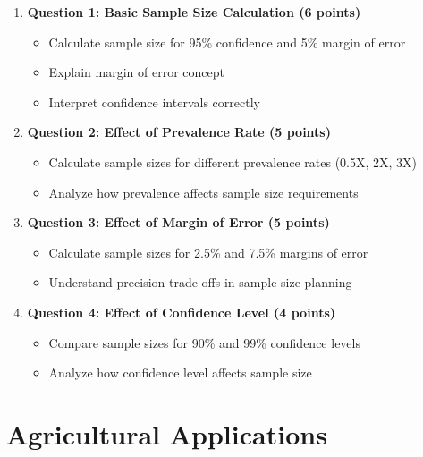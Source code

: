 \documentclass[11pt,a4paper]{article}
\begin{document}
\begin{enumerate}
    \item \textbf{Question 1: Basic Sample Size Calculation (6 points)}
    \begin{itemize}
        \item Calculate sample size for 95\% confidence and 5\% margin of error
        \item Explain margin of error concept
        \item Interpret confidence intervals correctly
    \end{itemize}
    
    \item \textbf{Question 2: Effect of Prevalence Rate (5 points)}
    \begin{itemize}
        \item Calculate sample sizes for different prevalence rates (0.5X, 2X, 3X)
        \item Analyze how prevalence affects sample size requirements
    \end{itemize}
    
    \item \textbf{Question 3: Effect of Margin of Error (5 points)}
    \begin{itemize}
        \item Calculate sample sizes for 2.5\% and 7.5\% margins of error
        \item Understand precision trade-offs in sample size planning
    \end{itemize}
    
    \item \textbf{Question 4: Effect of Confidence Level (4 points)}
    \begin{itemize}
        \item Compare sample sizes for 90\% and 99\% confidence levels
        \item Analyze how confidence level affects sample size
    \end{itemize}
\end{enumerate}

\section{Agricultural Applications}
\end{document}
